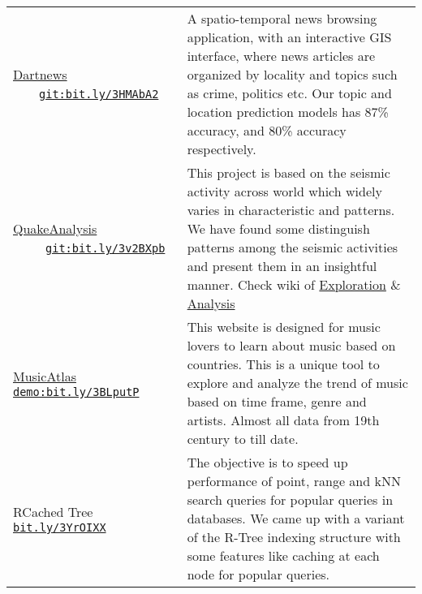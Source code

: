 \documentclass[8pt]{article}
\begin{document}
\begin{tabular}[t]{@{}>{\raggedright\arraybackslash}p{\textwidth-\rcollength-150pt}p{\rcollength+150pt}}
        \href{https://bit.ly/3HMAbA2}{Dartnews} ~~~~\href{https://bit.ly/3HMAbA2}{\scriptsize\texttt{git:bit.ly/3HMAbA2}}  & \hspace{0.5cm} A spatio-temporal news browsing application, with an interactive GIS interface, where news articles are organized by locality and topics such as crime, politics etc. Our topic and location prediction models has 87\% accuracy, and 80\% accuracy respectively.\\[0.1cm]
        \href{https://bit.ly/3v2BXpb}{QuakeAnalysis} ~~~~~\href{https://bit.ly/3v2BXpb}{\scriptsize\texttt{git:bit.ly/3v2BXpb}} & \hspace{0.5cm}  This project is based on the seismic activity across world which widely varies in characteristic and patterns. We have found some distinguish patterns among the seismic activities and present them in an insightful manner. Check wiki of \href{https://bitbucket.org/debjyotipaul385/quakeanalysis/wiki/Exploration}{Exploration} \& \href{https://bitbucket.org/debjyotipaul385/quakeanalysis/wiki/Analysis}{Analysis}\\
        \href{https://github.com/musicatlas/}{MusicAtlas}
        \href{https://bit.ly/3BLputP}{\scriptsize\texttt{demo:bit.ly/3BLputP}}
        & \hspace{0.5cm}  This website is designed for music lovers to learn about music based on countries. This is a unique tool to explore and analyze the trend of music based on time frame, genre and artists. Almost all data from 19th century to till date. \\[0.1cm]
       RCached Tree ~~~~~ \href{https://bit.ly/3YrOIXX}{\scriptsize\texttt{bit.ly/3YrOIXX}} & \hspace{0.5cm}  The objective is to speed up performance of point, range and kNN search queries for popular queries in databases. We came up with a variant of the R-Tree indexing structure with some features like caching at each node for popular queries.\\[0.1cm]


\end{tabular}
\end{document}
